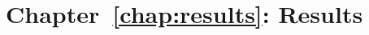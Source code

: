 \section{Chapter~\ref{chap:results}: Results}
\label{sec:symbols:results}

\begin{description}
	\item [\parbox{2cm}{$\alpha_{0}$}]
	\item [\parbox{2cm}{$\alpha_{6}$}]
	\item [\parbox{2cm}{$\alpha_{7}$}]
	\item [\parbox{2cm}{$\alpha_{8}$}]
	\item [\parbox{2cm}{$\alpha_{i} = 50$}]
	\item [\parbox{2cm}{$\boldsymbol{{H}}$}]
	\item [\parbox{2cm}{$\boldsymbol{\alpha}$}]
	\item [\parbox{2cm}{$\boldsymbol{\phi}$}]
	\item [\parbox{2cm}{$\boldsymbol{\psi}$}]
	\item [\parbox{2cm}{$\boldsymbol{\theta}$}]
	\item [\parbox{2cm}{$\boldsymbol{C}$}]
	\item [\parbox{2cm}{$\boldsymbol{E}$}]
	\item [\parbox{2cm}{$\boldsymbol{H}$}]
	\item [\parbox{2cm}{$\pm$}]
	\item [\parbox{2cm}{$\theta_{0}$}]
	\item [\parbox{2cm}{$\theta_{6}$}]
	\item [\parbox{2cm}{$\theta_{7}$}]
	\item [\parbox{2cm}{$\theta_{8}$}]
	\item [\parbox{2cm}{$c_{1}$}]
	\item [\parbox{2cm}{$Cat$}]
	\item [\parbox{2cm}{$Dir$}]
	\item [\parbox{2cm}{$e_{0}$}]
	\item [\parbox{2cm}{$h_{0}$}]
	\item [\parbox{2cm}{$h_{6}$}]
	\item [\parbox{2cm}{$h_{7}$}]
	\item [\parbox{2cm}{$h_{8}$}]
	\item [\parbox{2cm}{$i$}]
	\item [\parbox{2cm}{$K$}]
\end{description}
